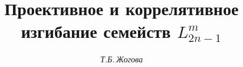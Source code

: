 

 


%


\newcommand{\tts}[1]{} 


 




 


\setcounter{page}{73} 












 


\author{\it Т.Б.\,Жогова} 




\title{Проективное и коррелятивное изгибание семейств $L^m_{2n-1}$} 


 


\date{} 




\pagestyle{plain} %


 




\maketitle 


\label{begin} 


 


